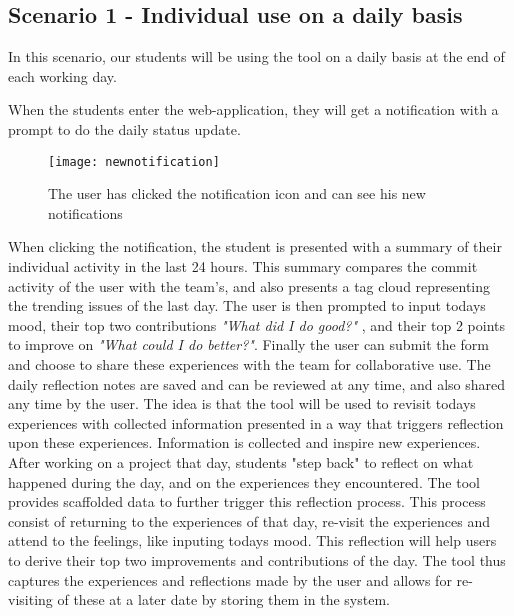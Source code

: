 \subsection{Scenario 1 - Individual use on a daily basis}
\label{scenario1}
In this scenario, our students will be using the tool on a daily basis at the end of each working day.

When the students enter the web-application, they will get a notification with a prompt to do the daily status update.

\begin{figure}[h!]
\label{newnotification}
\centering
	\texttt{[image: newnotification]}
\caption{The user has clicked the notification icon and can see his new notifications}
\end{figure}

  When clicking the notification, the student is presented with a summary of their individual activity in the last 24 hours.
  This summary compares the commit activity of the user with the team's, and also presents a tag cloud representing the trending issues of the last day. The user is then prompted to input todays mood, their top two contributions \emph{"What did I do good?"} , and their top 2 points to improve on \emph{"What could I do better?"}. Finally the user can submit the form and choose to share these experiences with the team for collaborative use. The daily reflection notes are saved and can be reviewed at any time, and also shared any time by the user. The idea is that the tool will be used to revisit todays experiences with collected information presented in a way that triggers reflection upon these experiences. Information is collected and inspire new experiences. After working on a project that day, students "step back" to reflect on what happened during the day, and on the experiences they encountered. The tool provides scaffolded data to further trigger this reflection process. This process consist of returning to the experiences of that day, re-visit the experiences and attend to the feelings, like inputing todays mood. This reflection will help users to derive their top two improvements and contributions of the day\cite{Krogstie2011}. The tool thus captures the experiences and reflections made by the user and allows for re-visiting of these at a later date by storing them in the system. 

